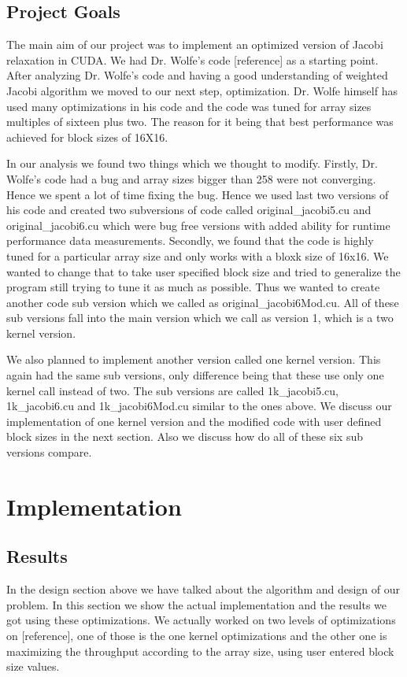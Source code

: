 \documentclass[10pt]{article}
\begin{document}
\begin{multicols}{2}
  \subsection{Project Goals}
  The main aim of our project was to implement an optimized version of Jacobi relaxation in CUDA.
  We had Dr. Wolfe’s code [reference] as a starting point.
  After analyzing Dr. Wolfe’s code and having a good understanding of weighted Jacobi algorithm we moved to our next step, optimization.
  Dr. Wolfe himself has used many optimizations in his code and the code was tuned for array sizes multiples of sixteen plus two.
  The reason for it being that best performance was achieved for block sizes of 16X16. 

  In our analysis we found two things which we thought to modify.
  Firstly, Dr. Wolfe’s code had a bug and array sizes bigger than 258 were not converging.
  Hence we spent a lot of time fixing the bug.
  Hence we used last two versions of his code and created two subversions of code called original\_jacobi5.cu and original\_jacobi6.cu which were bug free versions with added ability for runtime performance data measurements.
  Secondly, we found that the code is highly tuned for a particular array size and only works with a bloxk size of 16x16.
  We wanted to change that to take user specified block size and tried to generalize the program still trying to tune it as much as possible.
  Thus we wanted to create another code sub version which we called as original\_jacobi6Mod.cu.
  All of these sub versions fall into the main version which we call as version 1, which is a two kernel version.

  We also planned to implement another version called one kernel version.
  This again had the same sub versions, only difference being that these use only one kernel call instead of two.
  The sub versions are called 1k\_jacobi5.cu, 1k\_jacobi6.cu and 1k\_jacobi6Mod.cu similar to the ones above.
  We discuss our implementation of one kernel version and the modified code with user defined block sizes in the next section.
  Also we discuss how do all of these six sub versions compare.

  \section{Implementation}
  \subsection{Results} %
  In the design section above we have talked about the algorithm and design of our problem.
  In this section we show the actual implementation and the results we got using these optimizations.
  We actually worked on two levels of optimizations on [reference], one of those is the one kernel optimizations and the other one is maximizing the throughput according to the array size, using user entered block size values.


\end{multicols}
\end{document}
